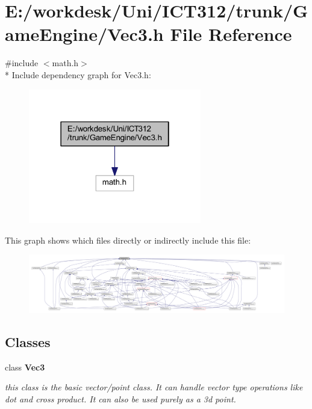 \section{E\+:/workdesk/\+Uni/\+I\+C\+T312/trunk/\+Game\+Engine/\+Vec3.h File Reference}
\label{_vec3_8h}
{\ttfamily \#include $<$math.\+h$>$}\\*
Include dependency graph for Vec3.\+h\+:\nopagebreak
\begin{figure}[H]
\begin{center}
\leavevmode
\includegraphics[width=214pt]{da/dae/_vec3_8h__incl}
\end{center}
\end{figure}
This graph shows which files directly or indirectly include this file\+:
\nopagebreak
\begin{figure}[H]
\begin{center}
\leavevmode
\includegraphics[width=350pt]{dd/dd7/_vec3_8h__dep__incl}
\end{center}
\end{figure}
\subsection*{Classes}
\begin{DoxyCompactItemize}
\item 
class {\bf Vec3}
\begin{DoxyCompactList}\small\item\em this class is the basic vector/point class. It can handle vector type operations like dot and cross product. It can also be used purely as a 3d point. \end{DoxyCompactList}\end{DoxyCompactItemize}
